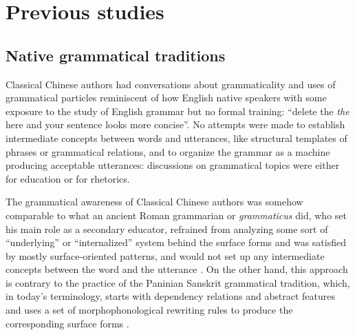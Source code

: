 \documentclass[UTF8, a4paper, oneside, scheme=plain, 12pt]{ctexrep}
\newcommand*{\citepages}[1]{pp.~{#1}}
\newcommand{\form}[1]{\emph{#1}}
\begin{document}
\section{Previous studies}

\subsection{Native grammatical traditions}\label{sec:introduction.previous.tradition}

Classical Chinese authors had conversations about grammaticality 
and uses of grammatical particles
reminiscent of how English native speakers
with some exposure to the study of English grammar but no formal training:
``delete the \form{the} here and your sentence looks more concise''.
No attempts were made to establish intermediate concepts between words and utterances,
like structural templates of phrases or grammatical relations, 
and to organize the grammar as a machine producing acceptable utterances:
discussions on grammatical topics were either for education or for rhetorics.

The grammatical awareness of Classical Chinese authors was somehow comparable to 
what an ancient Roman grammarian or \form{grammaticus} did,
who set his main role as a secondary educator,
refrained from analyzing some sort of ``underlying'' or ``internalized'' system behind the surface forms
and was satisfied by mostly surface-oriented patterns,
and would not set up any intermediate concepts between the word and the utterance
\citep[\citepages{7,35,47-48}]{matthews2019graeco}.
On the other hand, this approach is contrary to the practice
of the Paninian Sanskrit grammatical tradition,
which, in today's terminology, starts with dependency relations and abstract features
and uses a set of morphophonological rewriting rules to produce the corresponding surface forms
\citep{kiparsky2009architecture}.
\end{document}
